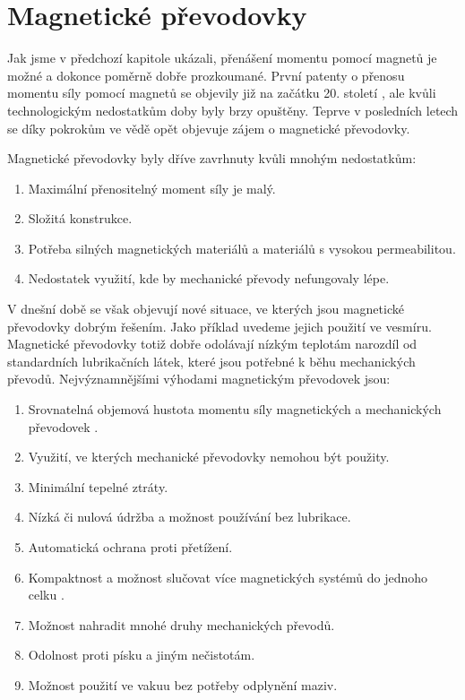 \chapter{Magnetické převodovky}

Jak jsme v předchozí kapitole ukázali, přenášení momentu pomocí magnetů je možné a dokonce poměrně dobře prozkoumané. První patenty o přenosu momentu síly pomocí magnetů se objevily již na začátku 20. století \cite{patent}, ale kvůli technologickým nedostatkům doby byly brzy opuštěny. Teprve v posledních letech se díky pokrokům ve vědě opět objevuje zájem o magnetické převodovky.

Magnetické převodovky byly dříve zavrhnuty kvůli mnohým nedostatkům:

\begin{enumerate}[topsep=0pt, partopsep=0pt]
    \setlength{\itemsep}{0pt}%
    \setlength{\parskip}{0pt}%
    \item Maximální přenositelný moment síly je malý.
    \item Složitá konstrukce.
    \item Potřeba silných magnetických materiálů a materiálů s vysokou permeabilitou.
    \item Nedostatek využití, kde by mechanické převody nefungovaly lépe.
\end{enumerate}

V dnešní době se však objevují nové situace, ve kterých jsou magnetické převodovky dobrým řešením. Jako příklad uvedeme jejich použití ve vesmíru. Magnetické převodovky totiž dobře odolávají nízkým teplotám \cite{NASA_MG} narozdíl od standardních lubrikačních látek, které jsou potřebné k běhu mechanických převodů. Nejvýznamnějšími výhodami magnetickým převodovek jsou:

\begin{enumerate}[topsep=0pt, partopsep=0pt]
    \setlength{\itemsep}{0pt}%
    \setlength{\parskip}{0pt}%
    \item Srovnatelná objemová hustota momentu síly magnetických a mechanických převodovek \cite{torque_dens}.
    \item Využití, ve kterých mechanické převodovky nemohou být použity.
    \item Minimální tepelné ztráty.
    \item Nízká či nulová údržba a možnost používání bez lubrikace.
    \item Automatická ochrana proti přetížení.
    \item Kompaktnost a možnost slučovat více magnetických systémů do jednoho celku \cite{MT_full}.
    \item Možnost nahradit mnohé druhy mechanických převodů.
    \item Odolnost proti písku a jiným nečistotám.
    \item Možnost použití ve vakuu bez potřeby odplynění maziv.
\end{enumerate}

